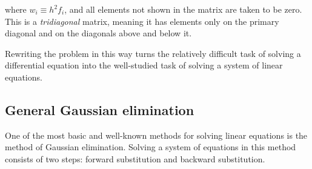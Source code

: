 \documentclass{article}
\begin{document}
        where $w_i \equiv h^2 f_i$, and all elements not shown in the matrix are taken to be zero. This is a \emph{tridiagonal} matrix, meaning it has elements only on the primary diagonal and on the diagonals above and below it.

        Rewriting the problem in this way turns the relatively difficult task of solving a differential equation into the well-studied task of solving a system of linear equations.

    \subsection{General Gaussian elimination}

        One of the most basic and well-known methods for solving linear equations is the method of Gaussian elimination. Solving a system of equations in this method consists of two steps: forward substitution and backward substitution.
\end{document}
